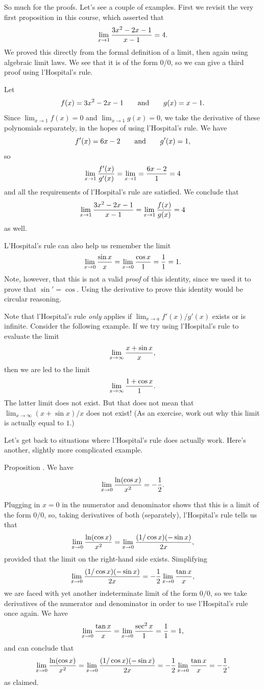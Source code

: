 So much for the proofs. Let's see a couple of examples. First we revisit the very first proposition
in this course, which asserted that
$$\lim_{x\to 1} {3x^2 - 2x-1\over x-1} = 4.$$
We proved this directly from the formal definition of a limit, then again using algebraic limit laws. We
see that it is of the form $0/0$, so we can give a third proof using l'Hospital's rule.

\medskip{}\enspace
Let
$$f(x) = 3x^2 - 2x-1\qquad\hbox{and}\qquad g(x) = x-1.$$
Since
$\lim_{x\to 1} f(x) = 0$ and $\lim_{x\to 1} g(x) = 0$, we take the derivative of these
polynomials separately, in the hopes of using l'Hospital's rule.
We have
$$f'(x) = 6x-2\qquad\hbox{and}\qquad g'(x) = 1,$$
so
$$\lim_{x\to 1} {f'(x)\over g'(x)} = \lim_{x\to 1} = {6x-2\over 1} = 4$$
and all the requirements of l'Hospital's rule are satisfied.
We conclude that
$$\lim_{x\to 1} {3x^2 - 2x-1\over x-1} = \lim_{x\to 1} {f(x)\over g(x)} = 4$$
as well.\slug

L'Hospital's rule can also help us remember the limit
$$\lim_{x\to 0} {\sin x\over x} = \lim_{x\to 0} {\cos x\over 1} = {1\over 1} = 1.$$
Note, however, that this is not a valid {\it proof} of this identity, since we used it to prove
that $\sin' = \cos$. Using the derivative to prove this identity would be circular reasoning.

Note that l'Hospital's rule {\it only} applies if $\lim_{x\to a} f'(x)/g'(x)$ exists or
is infinite. Consider the following example. If we try using l'Hospital's rule to evaluate the limit
$$\lim_{x\to \infty} {x+\sin x\over x},$$
then we are led to the limit
$$\lim_{x\to\infty} {1+\cos x\over 1}.$$
The latter limit does not exist. But that does not mean that $\lim_{x\to \infty} (x+\sin x)/x$ does not exist!
(As an exercise, work out why this limit is actually equal to $1$.)

Let's get back to situations where l'Hospital's rule does actually work.
Here's another, slightly more complicated example.

\proclaim Proposition \advthm. We have
$$\lim_{x\to 0} {\ln(\cos x)\over x^2} = -{1\over 2}.$$

\proof Plugging in $x=0$ in the numerator and denominator shows that this is a limit of the form $0/0$,
so, taking derivatives of both (separately), l'Hospital's rule tells us that
$$\lim_{x\to 0} {\ln(\cos x)\over x^2} = \lim_{x\to 0} {(1/\cos x) (-\sin x) \over 2x},$$
provided that the limit on the right-hand side exists. Simplifying
$$\lim_{x\to 0} {(1/\cos x)(-\sin x) \over 2x} = -{1\over 2} \lim_{x\to 0} {\tan x\over x},$$
we are faced with yet another indeterminate limit of the form $0/0$, so we take derivatives of the numerator
and denominator in order to use l'Hospital's rule once again. We have
$$\lim_{x\to 0} {\tan x\over x} = \lim_{x\to 0} {\sec^2 x\over 1} = {1\over 1} = 1,$$
and can conclude that
$$\lim_{x\to 0} {\ln(\cos x)\over x^2} = \lim_{x\to 0} {(1/\cos x) (-\sin x) \over 2x}
= -{1\over 2}\lim_{x\to 0} {\tan x\over x} = -{1\over 2},$$
as claimed.\slug

